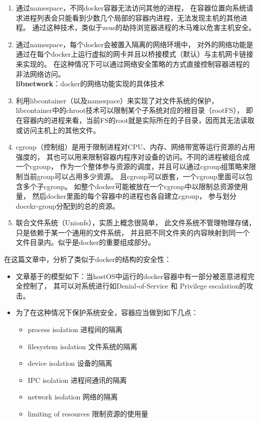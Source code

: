 \documentclass[AutoFakeBold,a4paper]{ctexart}
\begin{document}
\begin{enumerate}
    \item 通过namespace，不同docker容器无法访问其他的进程，
    在容器位置向系统请求进程列表会只能看到少数几个局部的容器内进程，无法发现主机的其他进程。
    通过这种技术，类似于zeus的劫持浏览器进程的木马难以危害主机安全。
    
    \item 通过namespace，每个docker会被置入隔离的网络环境中，
    对外的网络功能是通过在每个docker上运行虚拟的网卡并且以桥接模式（默认）与主机网卡链接来实现的。
    在这种情况下可以通过网络安全策略的方式直接控制容器进程的非法网络访问。\\
    \textbf{libnetwork}：docker的网络功能实现的具体技术
    
    \item 利用libcontainer（以及namespace）来实现了对文件系统的保护，
    libcontainer中的chroot技术可以限制某个子系统对应的根目录（rootFS），
    即在容器内的进程来看，当前FS的root就是实际所在的子目录，因而其无法读取或访问主机上的其他文件。
    
    \item cgroup（控制组）是用于限制进程对CPU、内存、网络带宽等运行资源的占用强度的，
    其也可以用来限制容器内程序对设备的访问。不同的进程被组合成一个cgroup，
    作为一个整体参与资源的调度，并且可以通过cgroup组策略来限制当前group可以占用多少资源。
    且cgroup可以嵌套，一个cgroup里面可以包含多个子cgroup。
    如整个docker可能被放在一个cgroup中以限制总资源使用量，
    然后docker里面的每个容器中的进程也各自建立cgroup，
    参与划分docekr-group分配到的总的资源。
    
    \item 联合文件系统（Unionfs），实质上概念很简单，
    此文件系统不管理物理存储，只是依赖于某一个通用的文件系统，
    并且把不同文件夹的内容映射到同一个文件目录内。似乎是docker的重要组成部分。
\end{enumerate}

在这篇文章中，分析了类似于docker的结构的安全性：\cite{bui2015analysis}

\begin{itemize}
    \item 文章基于的模型如下：当hostOS中运行的docker容器中有一部分被恶意进程完全控制了，
    其可以对系统进行如Denial-of-Service 和 Privilege escalation的攻击。
    \item 为了在这种情况下保护系统安全，容器应当做到如下几点：
    \begin{itemize}
        \item process isolation 进程间的隔离
        \item filesystem isolation  文件系统的隔离
        \item device isolation  设备的隔离
        \item IPC isolation 进程间通讯的隔离
        \item network isolation 网络的隔离
        \item limiting of resources 限制资源的使用量
    \end{itemize}
\end{itemize}
\end{document}
